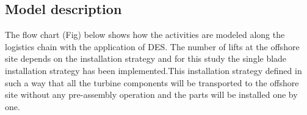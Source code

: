 \subsection{Model description}
The flow chart (Fig) below shows  how the activities are modeled along the logistics chain with the application of DES.  The number of lifts at the offshore site depends on the installation strategy and for this study the single blade installation strategy has been implemented.This installation strategy defined in such a way that all the turbine components will be transported to the offshore site without any pre-assembly operation and the parts will be installed one by one.  
